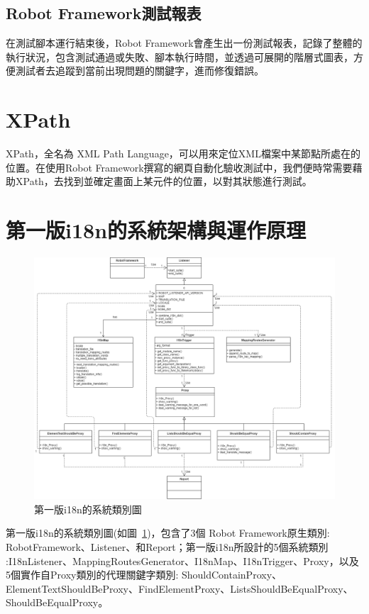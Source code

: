 \subsection{Robot Framework測試報表}
在測試腳本運行結束後，Robot Framework會產生出一份測試報表，記錄了整體的執行狀況，包含測試通過或失敗、腳本執行時間，並透過可展開的階層式圖表，方便測試者去追蹤到當前出現問題的關鍵字，進而修復錯誤。

\section{XPath}
XPath\cite{xpath}，全名為 XML Path Language，可以用來定位XML檔案中某節點所處在的位置。在使用Robot Framework撰寫的網頁自動化驗收測試中，我們便時常需要藉助XPath，去找到並確定畫面上某元件的位置，以對其狀態進行測試。

\section{第一版i18n的系統架構與運作原理}
\begin{figure}[H]
    \includegraphics[width= 1.1\textwidth]{../UML/i18n class diagram-第一版i18n class diagram.png}
    \caption{第一版i18n的系統類別圖}
    \label{1stI18nClassDiagram}
\end{figure}
第一版i18n的系統類別圖(如圖~\ref{1stI18nClassDiagram})，包含了3個 Robot Framework原生類別: RobotFramework、Listener、和Report；第一版i18n所設計的5個系統類別 :I18nListener、MappingRoutesGenerator、I18nMap、I18nTrigger、Proxy，以及5個實作自Proxy\cite{proxy}類別的代理關鍵字類別: ShouldContainProxy、ElementTextShouldBeProxy、FindElementProxy、ListsShouldBeEqualProxy、ShouldBeEqualProxy。\cite{i18n}

